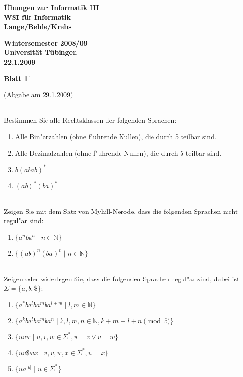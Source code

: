 \documentclass[a4paper]{article}
\def\header#1#2#3{\pagestyle{empty}
\noindent
\begin{minipage}[t]{0.6\textwidth}
\begin{flushleft}
\bf \"Ubungen zur Informatik III\\
WSI f\"ur Informatik\\
Lange/Behle/Krebs
\end{flushleft}
\end{minipage}
\begin{minipage}[t]{0.4\textwidth}
\begin{flushright}
\bf Wintersemester 2008/09\\
Universit\"at T\"ubingen\\
#2 %
\end{flushright}
\end{minipage}

\begin{center}
{\Large\bf Blatt #1}

{(Abgabe am #3)}
\end{center}
\bigskip
}
\begin{document}
\header{11}{22.1.2009}{29.1.2009}

\bigskip
{}\\
Bestimmen Sie alle Rechtsklassen der folgenden Sprachen:
\begin{enumerate}
\item Alle Bin"arzahlen (ohne f"uhrende Nullen), die durch 5 teilbar sind.
\item Alle Dezimalzahlen (ohne f"uhrende Nullen), die durch 5 teilbar sind.
\item $b(abab)^*$
\item $(ab)^*(ba)^*$
\end{enumerate}

\bigskip

\\
Zeigen Sie mit dem Satz von Myhill-Nerode, dass die folgenden Sprachen nicht regul"ar sind:
\begin{enumerate}
\item $\{a^nba^n\mid n\in\mathbb N\}$
\item $\{(ab)^n(ba)^n\mid n\in\mathbb N\}$
\end{enumerate}

\bigskip

\\
Zeigen oder widerlegen Sie, dass die folgenden Sprachen regul"ar sind, dabei ist $\Sigma=\{a,b,\$\}$:
\begin{enumerate}
\item $\{a^*ba^lba^mba^{l+m}\mid l,m\in\mathbb N\}$ 
\item $\{a^kba^lba^mba^{n}\mid k,l,m,n\in\mathbb N, k+m\equiv l+n\pmod 5\}$ 
\item $\{uvw\mid u,v,w\in\Sigma^*, u=v \lor v=w\}$
\item $\{uv\$wx\mid u,v,w,x\in\Sigma^*, u=x\}$
\item $\{ua^{|u|}\mid u\in\Sigma^*\}$
\end{enumerate}
\bigskip
\end{document}
